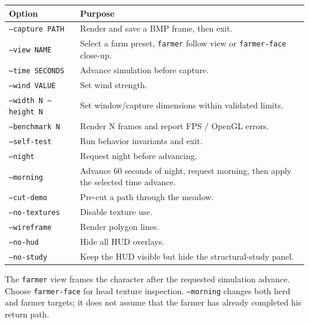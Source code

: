 \documentclass[11pt,a4paper,openany]{book}
\newcommand{\code}[1]{\texttt{#1}}
\begin{document}
\begin{longtable}{@{}lp{}@{}}
	\toprule
	Option                      & Purpose                                                                  \\
	\midrule
	\endhead
	\code{--capture PATH}       & Render and save a BMP frame, then exit.                                  \\
	\code{--view NAME}          & Select a farm preset, \code{farmer} follow view or \code{farmer-face} close-up. \\
	\code{--time SECONDS}       & Advance simulation before capture.                                       \\
	\code{--wind VALUE}         & Set wind strength.                                                       \\
	\code{--width N --height N} & Set window/capture dimensions within validated limits.                   \\
	\code{--benchmark N}        & Render N frames and report FPS / OpenGL errors.                          \\
	\code{--self-test}          & Run behavior invariants and exit.                                        \\
	\code{--night}              & Request night before advancing.                                          \\
	\code{--morning}            & Advance 60 seconds of night, request morning, then apply the selected time advance.                           \\
	\code{--cut-demo}           & Pre-cut a path through the meadow.                                       \\
	\code{--no-textures}        & Disable texture use.                                                     \\
	\code{--wireframe}          & Render polygon lines.                                                    \\
	\code{--no-hud}             & Hide all HUD overlays.                                                   \\
	\code{--no-study}           & Keep the HUD visible but hide the structural-study panel.                \\
	\bottomrule
\end{longtable}

The \code{farmer} view frames the character after the requested simulation advance. Choose \code{farmer-face} for head texture inspection. \code{--morning} changes both herd and farmer targets; it does not assume that the farmer has already completed his return path.
\end{document}
